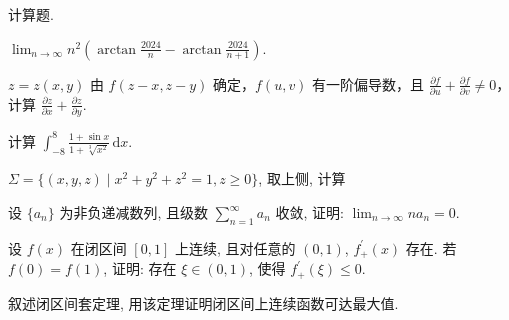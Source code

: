 \par{}
计算题.\par
$\lim_{n\to \infty}n^2\left(\arctan{\frac{2024}{n}} -\arctan{\frac{2024}{n + 1}}\right).$\par
$z = z(x,y)$ 由 $f(z - x,z - y)$ 确定，$f(u,v)$ 有一阶偏导数，且 $\frac{\partial f}{\partial u} + \frac{\partial f}{\partial v} \neq 0$，计算 $\frac{\partial z}{\partial x} + \frac{\partial z}{\partial y}$.\par
计算 $\int_{-8}^{8} \frac{1 + \sin x}{1 + \sqrt[3]{x^2}} \, \mathrm{d}x$.\par
\par{}
$\Sigma = \{(x, y, z) \mid x^2 + y^2 + z^2 = 1, z \geq 0\}$, 取上侧, 计算\par
\nopagebreak[4]
\par{}
设 $\{a_{n}\}$ 为非负递减数列, 且级数 $\sum_{n=1}^{\infty} a_{n}$ 收敛, 证明: $\lim_{n \to \infty} na_{n} = 0$.\par
\par{}
设 $f(x)$ 在闭区间 $[0,1]$ 上连续, 且对任意的 $(0,1)$, $f_{+}^{\prime}(x)$ 存在. 若 $f(0) = f(1)$, 证明: 存在 $\xi \in (0,1)$, 使得 $f_{+}^{\prime}(\xi) \leq 0$.\par
\par{}
叙述闭区间套定理, 用该定理证明闭区间上连续函数可达最大值.\par
\par{}
\par{}
